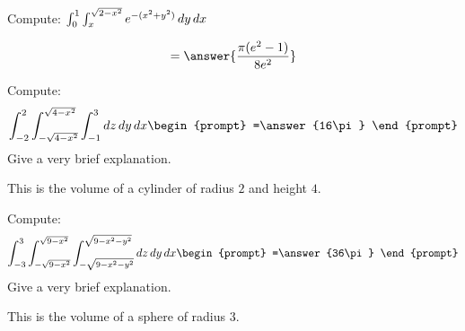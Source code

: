 \documentclass{ximera}
\begin{document}
\begin{problem}
  Compute:  $\int_0^1\int_x^{\sqrt{2-x^2}} e^{-(x^2+y^2)}\mathop{}\!d y \mathop{}\!d x$
  \begin{prompt}
    \[
    = \answer{\frac{\pi(e^2-1)}{8e^2}}
    \]
  \end{prompt}
  \vfill
\end{problem}




\begin{problem}
  Compute:
  \[
  \int_{-2}^{2} \int_{-\sqrt{4-x^2}}^{\sqrt{4-x^2}}\int_{-1}^3 \d z\d y \d x
  \begin{prompt}
  =\answer{16\pi}  
  \end{prompt}
  \]
  Give a very brief explanation.
  \begin{feedback}[correct]
    This is the volume of a cylinder of radius $2$ and height $4$.
  \end{feedback}
  \vfill
\end{problem}


\begin{problem}
  Compute:
  \[
  \int_{-3}^{3} \int_{-\sqrt{9-x^2}}^{\sqrt{9-x^2}}\int_{-\sqrt{9-x^2-y^2}}^{\sqrt{9-x^2-y^2}}\d z\d y \d x
  \begin{prompt}
    =\answer{36\pi}
  \end{prompt}
  \]
  Give a very brief explanation.
  \begin{feedback}[correct]
    This is the volume of a sphere of radius $3$.
  \end{feedback}
  \vfill
\end{problem}
\end{document}
